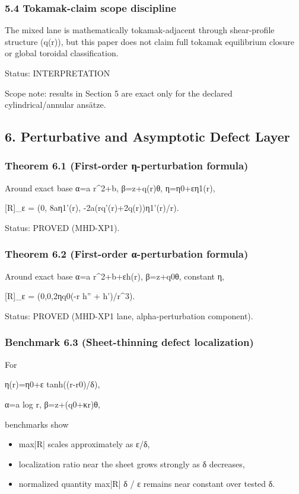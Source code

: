 \documentclass[11pt]{article}
\begin{document}
\subsubsection*{5.4 Tokamak-claim scope discipline}
The mixed lane is mathematically tokamak-adjacent through shear-profile structure (q(r)), but this paper does not claim full tokamak equilibrium closure or global toroidal classification.


Status: INTERPRETATION

Scope note: results in Section 5 are exact only for the declared cylindrical/annular ansätze.


\subsection*{6. Perturbative and Asymptotic Defect Layer}

\subsubsection*{Theorem 6.1 (First-order η-perturbation formula)}
Around exact base α=a r\textasciicircum{}2+b, β=z+q(r)θ, η=η0+εη1(r),


[R]\_ε = (0, 8aη1'(r), -2a(rq'(r)+2q(r))η1'(r)/r).


Status: PROVED (MHD-XP1).


\subsubsection*{Theorem 6.2 (First-order α-perturbation formula)}
Around exact base α=a r\textasciicircum{}2+b+εh(r), β=z+q0θ, constant η,


[R]\_ε = (0,0,2ηq0(-r h'' + h')/r\textasciicircum{}3).


Status: PROVED (MHD-XP1 lane, alpha-perturbation component).


\subsubsection*{Benchmark 6.3 (Sheet-thinning defect localization)}
For

η(r)=η0+ε tanh((r-r0)/δ),

α=a log r, β=z+(q0+κr)θ,

benchmarks show

\begin{itemize}
\item max|R| scales approximately as ε/δ,
\item localization ratio near the sheet grows strongly as δ decreases,
\item normalized quantity max|R| δ / ε remains near constant over tested δ.
\end{itemize}
\end{document}
